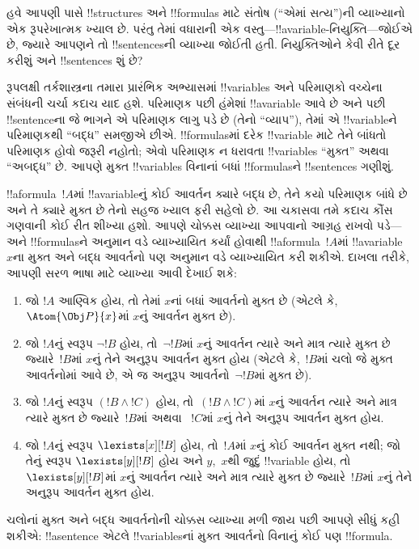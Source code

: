\documentclass[../../../include/open-logic-section]{subfiles}
\begin{document}


હવે આપણી પાસે !!{structure}s અને !!{formula}s માટે સંતોષ (``એમાં
સત્ય'')ની વ્યાખ્યાનો એક રૂપરેખાત્મક ખ્યાલ છે. પરંતુ તેમાં વધારાની એક
વસ્તુ---!!a{variable}-નિયુક્તિ---જોઈએ છે, જ્યારે આપણને તો
!!{sentence}sની વ્યાખ્યા જોઈતી હતી. નિયુક્તિઓને કેવી રીતે દૂર કરીશું
અને !!{sentence}s શું છે?

રૂપલક્ષી તર્કશાસ્ત્રના તમારા પ્રારંભિક અભ્યાસમાં !!{variable}s અને
પરિમાણકો વચ્ચેના સંબંધની ચર્ચા કદાચ યાદ હશે. પરિમાણક પછી હંમેશાં
!!a{variable} આવે છે અને પછી !!{sentence}ના જે ભાગને એ પરિમાણક લાગુ
પડે છે (તેનો ``વ્યાપ''), તેમાં એ !!{variable}ને પરિમાણકથી ``બદ્ધ''
સમજીએ છીએ. !!{formula}sમાં દરેક !!{variable} માટે તેને બાંધતો પરિમાણક
હોવો જરૂરી નહોતો; એવો પરિમાણક ન ધરાવતા !!{variable}s ``મુક્ત'' અથવા
``અબદ્ધ'' છે. આપણે મુક્ત !!{variable}s વિનાનાં બધાં !!{formula}sને
!!{sentence}s ગણીશું.

!!a{formula}~$!A$માં !!a{variable}નું કોઈ આવર્તન ક્યારે બદ્ધ છે, તેને
કયો પરિમાણક બાંધે છે અને તે ક્યારે મુક્ત છે તેનો સહજ ખ્યાલ ફરી સહેલો
છે. આ ચકાસવા તમે કદાચ કૌંસ ગણવાની કોઈ રીત શીખ્યા હશો. આપણે ચોક્કસ
વ્યાખ્યા આપવાનો આગ્રહ રાખવો પડે---અને !!{formula}sને અનુમાન વડે
વ્યાખ્યાયિત કર્યાં હોવાથી !!a{formula}~$!A$માં !!a{variable}~$x$ના
મુક્ત અને બદ્ધ આવર્તનો પણ અનુમાન વડે વ્યાખ્યાયિત કરી શકીએ. દાખલા
તરીકે, આપણી સરળ ભાષા માટે વ્યાખ્યા આવી દેખાઈ શકે:
\begin{enumerate}
  \item જો $!A$ આણ્વિક હોય, તો તેમાં $x$નાં બધાં આવર્તનો મુક્ત છે
  (એટલે કે,~$\Atom{\Obj P}{x}$માં $x$નું આવર્તન મુક્ત છે).
  \item જો $!A$નું સ્વરૂપ $\lnot !B$ હોય, તો~$\lnot !B$માં $x$નું
  આવર્તન ત્યારે અને માત્ર ત્યારે મુક્ત છે જ્યારે~$!B$માં $x$નું તેને
  અનુરૂપ આવર્તન મુક્ત હોય (એટલે કે,~$!B$માં ચલો જે મુક્ત આવર્તનોમાં
  આવે છે, એ જ અનુરૂપ આવર્તનો~$\lnot !B$માં મુક્ત છે).
  \item જો $!A$નું સ્વરૂપ $(!B \land !C)$ હોય, તો~$(!B \land !C)$માં
  $x$નું આવર્તન ત્યારે અને માત્ર ત્યારે મુક્ત છે જ્યારે~$!B$માં અથવા
  ~$!C$માં $x$નું તેને અનુરૂપ આવર્તન મુક્ત હોય.
  \item જો $!A$નું સ્વરૂપ $\lexists[x][!B]$ હોય, તો~$!A$માં $x$નું
  કોઈ આવર્તન મુક્ત નથી; જો તેનું સ્વરૂપ $\lexists[y][!B]$ હોય અને
  $y$,~$x$થી જુદું !!{variable} હોય, તો $\lexists[y][!B]$માં $x$નું
  આવર્તન ત્યારે અને માત્ર ત્યારે મુક્ત છે જ્યારે~$!B$માં $x$નું તેને
  અનુરૂપ આવર્તન મુક્ત હોય.
\end{enumerate}

ચલોનાં મુક્ત અને બદ્ધ આવર્તનોની ચોક્કસ વ્યાખ્યા મળી જાય પછી આપણે
સીધું કહી શકીએ: !!a{sentence} એટલે !!{variable}sનાં મુક્ત આવર્તનો
વિનાનું કોઈ પણ !!{formula}.
\end{document}
